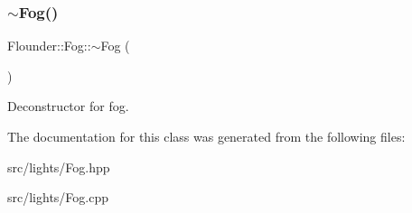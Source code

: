 \subsubsection{\texorpdfstring{$\sim$\+Fog()}{~Fog()}}
{\footnotesize\ttfamily Flounder\+::\+Fog\+::$\sim$\+Fog (\begin{DoxyParamCaption}{ }\end{DoxyParamCaption})}



Deconstructor for fog. 



The documentation for this class was generated from the following files\+:\begin{DoxyCompactItemize}
\item 
src/lights/Fog.\+hpp\item 
src/lights/Fog.\+cpp\end{DoxyCompactItemize}
